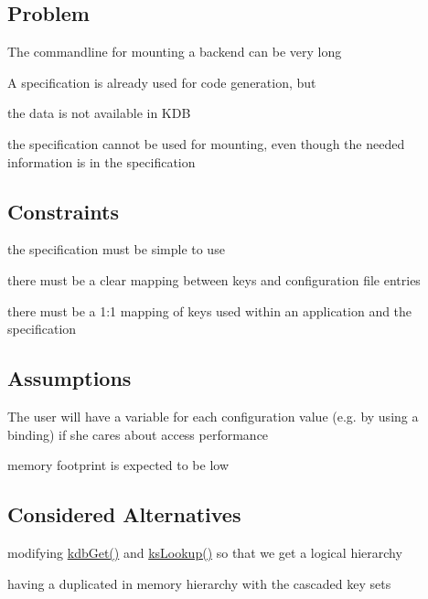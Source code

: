 \subsection*{Problem}


\begin{DoxyItemize}
\item The commandline for mounting a backend can be very long
\item A specification is already used for code generation, but
\begin{DoxyItemize}
\item the data is not available in K\+DB
\item the specification cannot be used for mounting, even though the needed information is in the specification
\end{DoxyItemize}
\end{DoxyItemize}

\subsection*{Constraints}


\begin{DoxyItemize}
\item the specification must be simple to use
\item there must be a clear mapping between keys and configuration file entries
\item there must be a 1\+:1 mapping of keys used within an application and the specification
\end{DoxyItemize}

\subsection*{Assumptions}


\begin{DoxyItemize}
\item The user will have a variable for each configuration value (e.\+g. by using a binding) if she cares about access performance
\item memory footprint is expected to be low
\end{DoxyItemize}

\subsection*{Considered Alternatives}


\begin{DoxyItemize}
\item modifying \hyperlink{group__kdb_ga28e385fd9cb7ccfe0b2f1ed2f62453a1}{kdb\+Get()} and \hyperlink{group__keyset_gaa34fc43a081e6b01e4120daa6c112004}{ks\+Lookup()} so that we get a logical hierarchy
\item having a duplicated in memory hierarchy with the cascaded key sets
\end{DoxyItemize}

